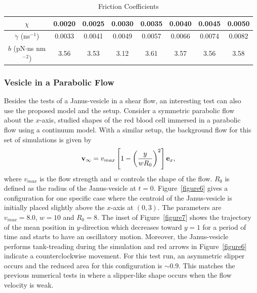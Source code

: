 \documentclass[lineno]{jfm}
\begin{document}
\begin{table}
\caption{Friction Coefficients}
\centering    
\begin{tabular}{c c c c c c c c }
 $\chi$ & 0.0020   &  0.0025 &  0.0030 &  0.0035 &  0.0040 & 0.0045 & 0.0050  \\
\hline                    
$\dot\gamma$ (ns$^{-1}$)        & 0.0033 & 0.0041 & 0.0049 & 0.0057 & 0.0066 & 0.0074 & 0.0082\\
$b$ (pN$\cdot$ns nm$^{-2}$)    & 3.56 & 3.53 & 3.12 & 3.61 & 3.57 & 3.56 & 3.58\\ 
\hline    
\end{tabular} 
\label{table1}
\end{table}


\subsubsection{Vesicle in a Parabolic Flow}

Besides the tests of a Janus-vesicle in a shear flow, an interesting test can also use the proposed model and the setup. Consider a symmetric parabolic flow about the $x$-axis, \cite{Kaoui09} studied shapes of the red blood cell immersed in a parabolic flow using a continuum model. With a similar setup, the background flow for this set of simulations is given by
\begin{equation}
{\bf v}_\infty = v_{max}\left[ 1 - \left( \frac{y}{wR_0}\right)^2 \right]{\bf e}_x,
\end{equation}
%
where $v_{max}$ is the flow strength and $w$ controls the shape of the flow. $R_0$ is defined as the radius of the Janus-vesicle at $t=0$. Figure~\ref{figure6} gives a configuration for one specific case where the centroid of the Janus-vesicle is initially placed slightly above the $x$-axis at $(0,3)$. The parameters are $v_{max} = 8.0$, $w=10$ and $R_0=8$. The inset of Figure~\ref{figure7} shows the trajectory of the mean position in $y$-direction which decreases toward $y=1$ for a period of time and starts to have an oscillatory motion. Moreover, the Janus-vesicle performs tank-treading during the simulation and red arrows in Figure~\ref{figure6} indicate a counterclockwise movement. For this test run, an asymmetric slipper occurs and the reduced area for this configuration is $\sim0.9$. This matches the previous numerical tests in  \cite{Kaoui09} where a slipper-like shape occurs when the flow velocity is weak.
\end{document}
